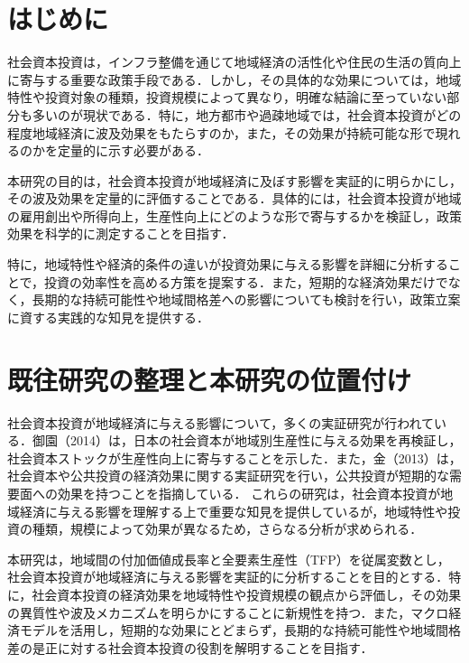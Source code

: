 \documentclass[a4paper, 10.5pt, twocolumn, dvipdfmx]{jarticle}
\begin{document}
\thispagestyle{firstpage}



\section{はじめに}
社会資本投資は，インフラ整備を通じて地域経済の活性化や住民の生活の質向上に寄与する重要な政策手段である．しかし，その具体的な効果については，地域特性や投資対象の種類，投資規模によって異なり，明確な結論に至っていない部分も多いのが現状である．特に，地方都市や過疎地域では，社会資本投資がどの程度地域経済に波及効果をもたらすのか，また，その効果が持続可能な形で現れるのかを定量的に示す必要がある．

本研究の目的は，社会資本投資が地域経済に及ぼす影響を実証的に明らかにし，その波及効果を定量的に評価することである．具体的には，社会資本投資が地域の雇用創出や所得向上，生産性向上にどのような形で寄与するかを検証し，政策効果を科学的に測定することを目指す．

特に，地域特性や経済的条件の違いが投資効果に与える影響を詳細に分析することで，投資の効率性を高める方策を提案する．また，短期的な経済効果だけでなく，長期的な持続可能性や地域間格差への影響についても検討を行い，政策立案に資する実践的な知見を提供する．

\section{既往研究の整理と本研究の位置付け}
社会資本投資が地域経済に与える影響について，多くの実証研究が行われている．御園（2014）\cite{misono2014}は，日本の社会資本が地域別生産性に与える効果を再検証し，社会資本ストックが生産性向上に寄与することを示した．また，金（2013）\cite{kim2013}は，社会資本や公共投資の経済効果に関する実証研究を行い，公共投資が短期的な需要面への効果を持つことを指摘している． これらの研究は，社会資本投資が地域経済に与える影響を理解する上で重要な知見を提供しているが，地域特性や投資の種類，規模によって効果が異なるため，さらなる分析が求められる．


本研究は，地域間の付加価値成長率と全要素生産性（TFP）を従属変数とし，社会資本投資が地域経済に与える影響を実証的に分析することを目的とする．特に，社会資本投資の経済効果を地域特性や投資規模の観点から評価し，その効果の異質性や波及メカニズムを明らかにすることに新規性を持つ．また，マクロ経済モデルを活用し，短期的な効果にとどまらず，長期的な持続可能性や地域間格差の是正に対する社会資本投資の役割を解明することを目指す．
\end{document}
